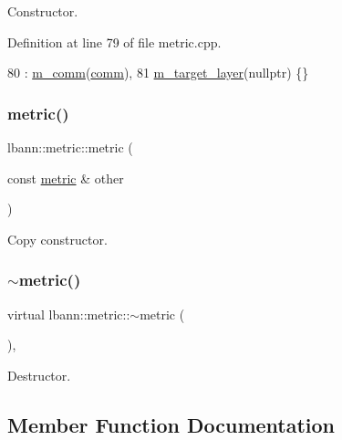 Constructor. 

Definition at line 79 of file metric.\+cpp.


\begin{DoxyCode}
80   : \hyperlink{classlbann_1_1metric_a547077709911e30c7d070545936c9c85}{m\_comm}(\hyperlink{file__io_8cpp_ab048c6f9fcbcfaa57ce68b00263dbebe}{comm}),
81     \hyperlink{classlbann_1_1metric_a2bf6c53efb1b525bfa63a8c3167968d9}{m\_target\_layer}(\textcolor{keyword}{nullptr}) \{\}
\end{DoxyCode}
\mbox{\label{classlbann_1_1metric_ac2fc993e31fed5298c4e321b315b77a0}} 
\subsubsection{\texorpdfstring{metric()}{metric()}\hspace{0.1cm}{\footnotesize\ttfamily [2/2]}}
{\footnotesize\ttfamily lbann\+::metric\+::metric (\begin{DoxyParamCaption}\item[{const \hyperlink{classlbann_1_1metric}{metric} \&}]{other }\end{DoxyParamCaption})\hspace{0.3cm}{\ttfamily [default]}}

Copy constructor. \mbox{\label{classlbann_1_1metric_ae173eae981ed474f125a5462e734802b}} 
\subsubsection{\texorpdfstring{$\sim$metric()}{~metric()}}
{\footnotesize\ttfamily virtual lbann\+::metric\+::$\sim$metric (\begin{DoxyParamCaption}{ }\end{DoxyParamCaption})\hspace{0.3cm}{\ttfamily [virtual]}, {\ttfamily [default]}}

Destructor. 

\subsection{Member Function Documentation}
\mbox{\label{classlbann_1_1metric_a2a4498d41f77da8585552f485caab167}} 
